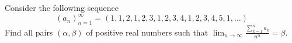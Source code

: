 Consider the following sequence
\[(a_n)_{n=1}^{\infty}=(1,1,2,1,2,3,1,2,3,4,1,2,3,4,5,1,\dots)\]Find all pairs \((\alpha, \beta)\) of positive real numbers such that \(\lim_{n\to \infty}\frac{\displaystyle\sum_{k=1}^n a_k}{n^{\alpha}}=\beta\).